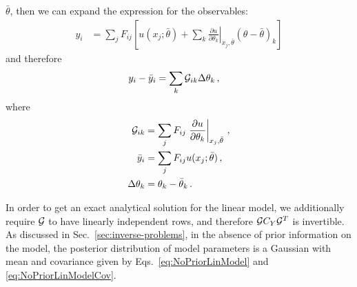 $\bar\theta$, then we can expand the expression for the observables:
\begin{align}
    y_i  &= 
        \sum_j F_{ij} \left[u(x_j; \bar\theta)
         + \sum_k \left.\frac{\partial u}{\partial \theta_k}\right|_{x_j,\bar\theta} 
         \left(\theta - \bar\theta\right)_k
        \right]
\end{align}
and therefore
\begin{align}
    y_i - \bar{y}_i &=
         \sum_k \mathcal{G}_{ik} \Delta\theta_k
        \,,         
\end{align}
where 
\begin{align}
    \mathcal{G}_{ik} &= 
        \sum_j F_{ij} \left.\frac{\partial u}{\partial \theta_k}\right|_{x_j,\bar\theta}\, , \\
    \bar{y}_i &= \sum_j F_{ij} u(x_j; \bar\theta)\, , \\
    \Delta\theta_k &= \theta_k - \bar\theta_k\, .
\end{align}

In order to get an exact analytical solution for the linear model, we
additionally require $\mathcal{G}$ to have linearly independent rows, and therefore
$\mathcal{G} C_{Y} \mathcal{G}^T$ is invertible. As discussed in
Sec.~\ref{sec:inverse-problems}, in the absence of prior information on the
model, the posterior distribution of model parameters is a Gaussian with mean
and covariance given by Eqs.~\ref{eq:NoPriorLinModel} and
\ref{eq:NoPriorLinModelCov}.

